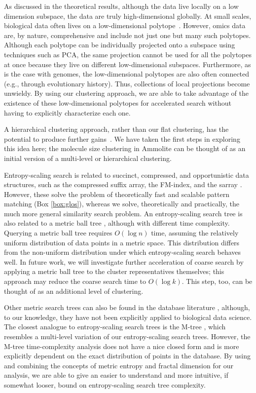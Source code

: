 \documentclass[review,preprint,12pt]{elsarticle}
\renewcommand{\cite}{\citep} %
\theoremstyle{definition}
\theoremstyle{remark}
\numberwithin{equation}{section}
\begin{document}
As discussed in the theoretical results, although the data live locally on a 
low dimension subspace, the data are truly high-dimensional globally.
At small scales, biological data often lives on a low-dimensional polytope~\cite{hart2015inferring}.
However, omics data are, by nature, comprehensive and include not just one but many such polytopes.
Although each polytope can be individually projected onto a subspace using techniques such as PCA, the same projection cannot be used for all the polytopes at once because they live on different low-dimensional subspaces.
Furthermore, as is the case with genomes, the low-dimensional polytopes are also often connected (e.g., through evolutionary history).
Thus, collections of local projections become unwieldy.
By using our clustering approach, we are able to take advantage of the existence of these low-dimensional polytopes for accelerated search without having to explicitly characterize each one.

A hierarchical clustering approach, rather than our flat clustering, has the
potential to produce further gains~\cite{loh2012compressive}.
We have taken the first steps in exploring this idea here; the
molecule size clustering in Ammolite can be thought of as an initial version of a multi-level or hierarchical clustering.

Entropy-scaling search is related to succinct, compressed, and opportunistic data structures, such as the compressed suffix array, the FM-index, and the sarray \cite{grossi2005compressed,ferragina2000opportunistic,conway2011succinct}.
However, these solve the problem of theoretically fast and scalable pattern matching (Box \ref{box:glos}), whereas we solve, theoretically and practically, the much more general similarity search problem.
An entropy-scaling search tree is also related to a metric ball tree \cite{uhlmann1991satisfying}, although with different time complexity.
Querying a metric ball tree requires $O(\log n)$ time, assuming the relatively uniform distribution of data points in a metric space.
This distribution differs from the non-uniform distribution under which entropy-scaling search behaves well.
In future work, we will investigate further acceleration of coarse search by applying a metric ball tree to the cluster representatives themselves; this approach may reduce the coarse search time to $O(\log k)$.
This step, too, can be thought of as an additional level of clustering.

Other metric search trees can also be found in the database literature \cite{zezula2006similarity}, although, to our knowledge, they have not been explicitly applied to biological data science.
The closest analogue to entropy-scaling search trees is the M-tree \cite{ciaccia1997deis,ciaccia1998cost}, which resembles a multi-level variation of our entropy-scaling search trees.
However, the M-tree time-complexity analysis \cite{ciaccia1998cost} does not have a nice closed form and is more explicitly dependent on the exact distribution of points in the database.
By using and combining the concepts of metric entropy and fractal dimension for our analysis, we are able to give an easier to understand and more intuitive, if somewhat looser, bound on entropy-scaling search tree complexity.
\end{document}
